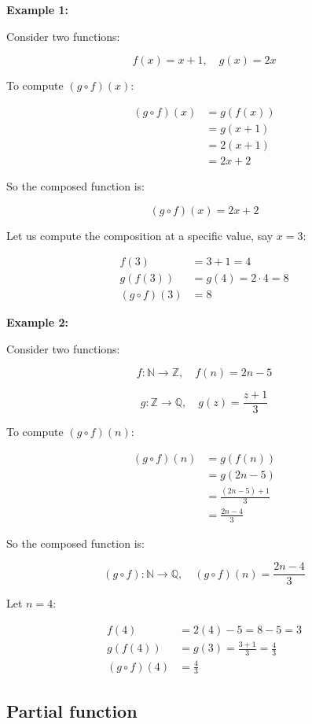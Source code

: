 \documentclass[12pt,a4paper,openany]{article}
\begin{document}
\textbf{Example 1: }

Consider two functions:

\[
f(x) = x + 1, \quad g(x) = 2x
\]

To compute $(g \circ f)(x)$:

\[
\begin{aligned}
(g \circ f)(x) &= g(f(x)) \\
&= g(x + 1) \\
&= 2(x + 1) \\
&= 2x + 2
\end{aligned}
\]

So the composed function is:

\[
(g \circ f)(x) = 2x + 2
\]

Let us compute the composition at a specific value, say $x = 3$:

\[
\begin{aligned}
f(3) &= 3 + 1 = 4 \\
g(f(3)) &= g(4) = 2 \cdot 4 = 8 \\
(g \circ f)(3) &= 8
\end{aligned}
\]


\textbf{Example 2:}

Consider two functions:

\[
f: \mathbb{N} \to \mathbb{Z}, \quad f(n) = 2n - 5
\]

\[
g: \mathbb{Z} \to \mathbb{Q}, \quad g(z) = \displaystyle\frac{z + 1}{3}
\]

To compute $(g \circ f)(n)$:

\[
\begin{aligned}
(g \circ f)(n) &= g(f(n)) \\
&= g(2n - 5) \\
&= \frac{(2n - 5) + 1}{3} \\
&= \frac{2n - 4}{3}
\end{aligned}
\]

So the composed function is:

\[
(g \circ f): \mathbb{N} \to \mathbb{Q}, \quad (g \circ f)(n) = \displaystyle\frac{2n - 4}{3}
\]

Let $n = 4$:

\[
\begin{aligned}
f(4) &= 2(4) - 5 = 8 - 5 = 3 \\
g(f(4)) &= g(3) = \frac{3 + 1}{3} = \frac{4}{3} \\
(g \circ f)(4) &= \frac{4}{3}
\end{aligned}
\]

\subsection{Partial function}
\end{document}
